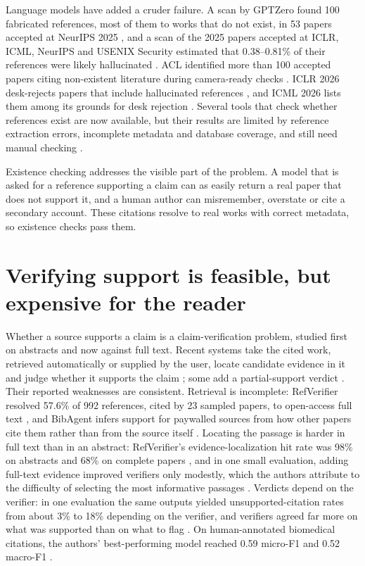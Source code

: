 \documentclass[11pt]{article}
\begin{document}
Language models have added a cruder failure. A scan by GPTZero found 100 fabricated references, most of them to works that do not exist, in 53 papers accepted at NeurIPS 2025 \citep{ansari2026compound}, and a scan of the 2025 papers accepted at ICLR, ICML, NeurIPS and USENIX Security estimated that 0.38--0.81\% of their references were likely hallucinated \citep{russinovich2026phantom}. ACL identified more than 100 accepted papers citing non-existent literature during camera-ready checks \citep{acl2026statement}. ICLR 2026 desk-rejects papers that include hallucinated references \citep{iclr2026response}, and ICML 2026 lists them among its grounds for desk rejection \citep{icml2026ethics}. Several tools that check whether references exist are now available, but their results are limited by reference extraction errors, incomplete metadata and database coverage, and still need manual checking \citep{badalova2026hallucinated}.

Existence checking addresses the visible part of the problem. A model that is asked for a reference supporting a claim can as easily return a real paper that does not support it, and a human author can misremember, overstate or cite a secondary account. These citations resolve to real works with correct metadata, so existence checks pass them.

\section{Verifying support is feasible, but expensive for the reader}

Whether a source supports a claim is a claim-verification problem, studied first on abstracts \citep{wadden2020scifact} and now against full text. Recent systems take the cited work, retrieved automatically or supplied by the user, locate candidate evidence in it and judge whether it supports the claim \citep{haan2025semanticcite,mocan2026refverifier,sadeghi2026deepsciverify,lee2026reflens,li2026bibagent}; some add a partial-support verdict \citep{haan2025semanticcite,mocan2026refverifier}. Their reported weaknesses are consistent. Retrieval is incomplete: RefVerifier resolved 57.6\% of 992 references, cited by 23 sampled papers, to open-access full text \citep{mocan2026refverifier}, and BibAgent infers support for paywalled sources from how other papers cite them rather than from the source itself \citep{li2026bibagent}. Locating the passage is harder in full text than in an abstract: RefVerifier's evidence-localization hit rate was 98\% on abstracts and 68\% on complete papers \citep{mocan2026refverifier}, and in one small evaluation, adding full-text evidence improved verifiers only modestly, which the authors attribute to the difficulty of selecting the most informative passages \citep{sadeghi2026deepsciverify}. Verdicts depend on the verifier: in one evaluation the same outputs yielded unsupported-citation rates from about 3\% to 18\% depending on the verifier, and verifiers agreed far more on what was supported than on what to flag \citep{goo2026citefaithfulness}. On human-annotated biomedical citations, the authors' best-performing model reached 0.59 micro-F1 and 0.52 macro-F1 \citep{sarol2024citationintegrity}.
\end{document}

